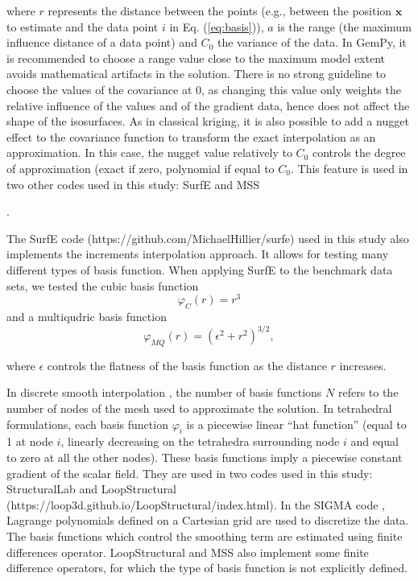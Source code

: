 \documentclass[final]{ring20}
\newcommand{\bx}{\mathbf{x}}
\begin{document}
where $r$ represents the distance between the points (e.g., between the position $\bx$ to estimate and the data point $i$ in Eq. (\ref{eq:basis})), $a$ is the range (the maximum influence distance of a data point) 
and $C_0$ the variance of the data. In GemPy, it is recommended to choose a range value close to the
maximum model extent avoids mathematical artifacts in the solution. There is no strong guideline 
to choose the values of the covariance at 0, as changing this value only weights the relative influence of the values and of the gradient data, hence does not affect the shape of the isosurfaces. As in classical kriging, it is also possible to add a nugget effect to the covariance function to transform the exact interpolation as an approximation. In this case, the nugget value relatively to $C_0$ controls the degree of approximation (exact if zero, polynomial if equal to $C_0$. This feature is used in two other codes used in this study: SurfE \citep{Hillier2014MG} and MSS {\citep{Renaudeau2019MG}. 

The SurfE code \citep{Hillier2014MG} (https://github.com/MichaelHillier/surfe) used in this study also implements the increments interpolation approach. It allows for testing many different types of basis function. When applying SurfE to the benchmark data sets, we tested the cubic basis function 
\begin{equation}
\varphi_{C}(r) = r^3
\end{equation}
and a multiqudric basis function
\begin{equation}
\varphi_{MQ}(r) = (\epsilon^2 + r^2)^{3/2},
\end{equation}

where $\epsilon$ controls the flatness of the basis function as the distance $r$ increases. 

In discrete smooth interpolation \citep[DSI, ][]{Frank2007CG,Caumon2013GaRSITo,Souche20137ECEISE2,Laurent2016MG,Irakarama2018EAGE}, the number of basis functions $N$ refers to the number of nodes of the mesh used to approximate the solution. In tetrahedral formulations, each basis function $\varphi_i$ is a piecewise linear ``hat function'' (equal to 1 at node $i$, linearly decreasing on the tetrahedra surrounding node $i$ and equal to zero at all the other nodes). These basis functions imply a piecewise constant gradient of the scalar field. They are used in two codes used in this study: StructuralLab \citep{Frank2007CG,Caumon2013GaRSITo} and LoopStructural (https://loop3d.github.io/LoopStructural/index.html). 
In the SIGMA code \cite{Irakarama2018EAGE}, Lagrange polynomials defined on a Cartesian grid are used to discretize the data. The basis functions which control the smoothing term are estimated using finite differences operator. LoopStructural and MSS also implement some finite difference operators, for which the type of basis function is not explicitly defined. 

}
\end{document}
